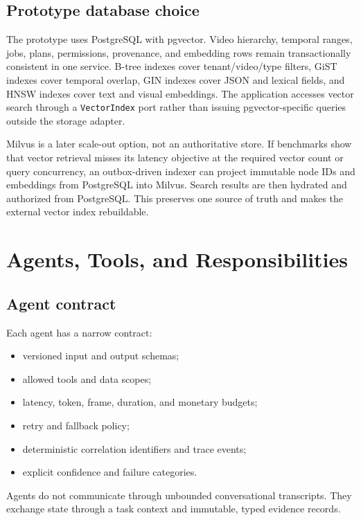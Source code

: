 \documentclass[11pt]{article}
\newcommand{\code}[1]{\texttt{#1}}
\begin{document}
\subsection{Prototype database choice}

The prototype uses PostgreSQL with pgvector. Video hierarchy, temporal ranges,
jobs, plans, permissions, provenance, and embedding rows remain transactionally
consistent in one service. B-tree indexes cover tenant/video/type filters, GiST
indexes cover temporal overlap, GIN indexes cover JSON and lexical fields, and
HNSW indexes cover text and visual embeddings. The application accesses vector
search through a \code{VectorIndex} port rather than issuing pgvector-specific
queries outside the storage adapter.

Milvus is a later scale-out option, not an authoritative store. If benchmarks
show that vector retrieval misses its latency objective at the required vector
count or query concurrency, an outbox-driven indexer can project immutable node
IDs and embeddings from PostgreSQL into Milvus. Search results are then hydrated
and authorized from PostgreSQL. This preserves one source of truth and makes the
external vector index rebuildable.

\section{Agents, Tools, and Responsibilities}

\subsection{Agent contract}

Each agent has a narrow contract:

\begin{itemize}
  \item versioned input and output schemas;
  \item allowed tools and data scopes;
  \item latency, token, frame, duration, and monetary budgets;
  \item retry and fallback policy;
  \item deterministic correlation identifiers and trace events;
  \item explicit confidence and failure categories.
\end{itemize}

Agents do not communicate through unbounded conversational transcripts. They
exchange state through a task context and immutable, typed evidence records.
\end{document}
